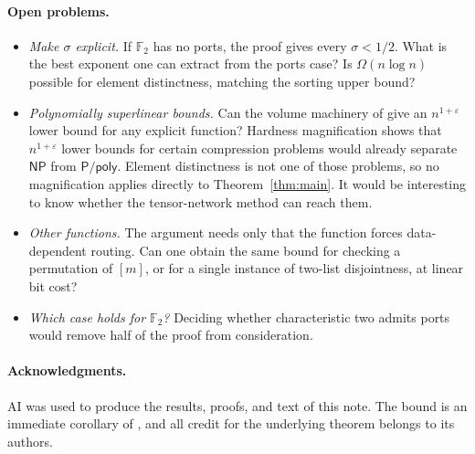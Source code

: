 \documentclass[11pt]{article}
\theoremstyle{definition}
\theoremstyle{remark}
\newcommand{\F}{\mathbb{F}}
\begin{document}
\paragraph{Open problems.}
\begin{itemize}
\item \emph{Make $\sigma$ explicit.} If $\F_2$ has no ports, the proof
gives every $\sigma<1/2$. What is the best exponent one can extract from
the ports case? Is $\Omega(n\log n)$ possible for element distinctness,
matching the sorting upper bound?
\item \emph{Polynomially superlinear bounds.} Can the volume machinery
of \cite{OAI,Geom,HC} give an $n^{1+\varepsilon}$ lower bound for any
explicit function? Hardness magnification \cite{MMW,OS} shows that
$n^{1+\varepsilon}$ lower bounds for certain compression problems would
already separate $\mathsf{NP}$ from $\mathsf{P}/\mathsf{poly}$. Element
distinctness is not one of those problems, so no magnification applies
directly to Theorem~\ref{thm:main}. It would be interesting to know
whether the tensor-network method can reach them.
\item \emph{Other functions.} The argument needs only that the function
forces data-dependent routing. Can one obtain the same bound for
checking a permutation of $[m]$, or for a single instance of two-list
disjointness, at linear bit cost?
\item \emph{Which case holds for $\F_2$?} Deciding whether characteristic
two admits ports would remove half of the proof from consideration.
\end{itemize}

\paragraph{Acknowledgments.}
AI was used to produce the results, proofs, and text of this note.
The bound is an immediate corollary of \cite[Theorem~2.2]{OAI}, and all
credit for the underlying theorem belongs to its authors.
\end{document}
